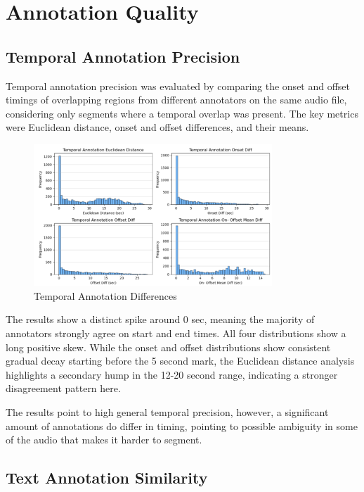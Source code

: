 \documentclass{article}
\begin{document}
\section{Annotation Quality}
\label{sec:annotation_quality}

\subsection{Temporal Annotation Precision}

Temporal annotation precision was evaluated by comparing the onset and offset timings of overlapping regions from different annotators on the same audio file, considering only segments where a temporal overlap was present. The key metrics were Euclidean distance, onset and offset differences, and their means.

\begin{figure}[ht]
  \centering
  \includegraphics[width=0.8\textwidth]{figures/annotation_quality/temporal_annotation_differences.png}
  \caption{Temporal Annotation Differences}
  \label{fig:temporal_diff}
\end{figure}

The results show a distinct spike around 0 sec, meaning the majority of annotators strongly agree on start and end times. All four distributions show a long positive skew. While the onset and offset distributions show consistent gradual decay starting before the 5 second mark, the Euclidean distance analysis highlights a secondary hump in the 12-20 second range, indicating a stronger disagreement pattern here.

The results point to high general temporal precision, however, a significant amount of annotations do differ in timing, pointing to possible ambiguity in some of the audio that makes it harder to segment.

\subsection{Text Annotation Similarity}
\end{document}

